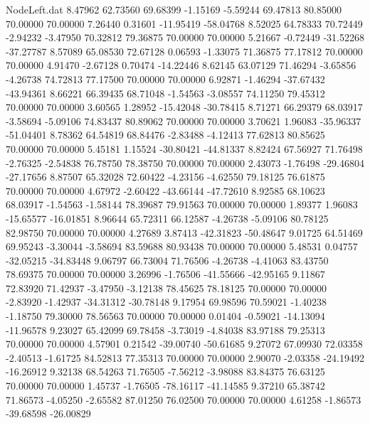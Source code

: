 \begin{filecontents}{NodeLeft.dat}
   8.47962   62.73560   69.68399    -1.15169   -5.59244   69.47813   80.85000   70.00000   70.00000    7.26440    0.31601  -11.95419  -58.04768
   8.52025   64.78333   70.72449    -2.94232   -3.47950   70.32812   79.36875   70.00000   70.00000    5.21667   -0.72449  -31.52268  -37.27787
   8.57089   65.08530   72.67128     0.06593   -1.33075   71.36875   77.17812   70.00000   70.00000    4.91470   -2.67128    0.70474  -14.22446
   8.62145   63.07129   71.46294    -3.65856   -4.26738   74.72813   77.17500   70.00000   70.00000    6.92871   -1.46294  -37.67432  -43.94361
   8.66221   66.39435   68.71048    -1.54563   -3.08557   74.11250   79.45312   70.00000   70.00000    3.60565    1.28952  -15.42048  -30.78415
   8.71271   66.29379   68.03917    -3.58694   -5.09106   74.83437   80.89062   70.00000   70.00000    3.70621    1.96083  -35.96337  -51.04401
   8.78362   64.54819   68.84476    -2.83488   -4.12413   77.62813   80.85625   70.00000   70.00000    5.45181    1.15524  -30.80421  -44.81337
   8.82424   67.56927   71.76498    -2.76325   -2.54838   76.78750   78.38750   70.00000   70.00000    2.43073   -1.76498  -29.46804  -27.17656
   8.87507   65.32028   72.60422    -4.23156   -4.62550   79.18125   76.61875   70.00000   70.00000    4.67972   -2.60422  -43.66144  -47.72610
   8.92585   68.10623   68.03917    -1.54563   -1.58144   78.39687   79.91563   70.00000   70.00000    1.89377    1.96083  -15.65577  -16.01851
   8.96644   65.72311   66.12587    -4.26738   -5.09106   80.78125   82.98750   70.00000   70.00000    4.27689    3.87413  -42.31823  -50.48647
   9.01725   64.51469   69.95243    -3.30044   -3.58694   83.59688   80.93438   70.00000   70.00000    5.48531    0.04757  -32.05215  -34.83448
   9.06797   66.73004   71.76506    -4.26738   -4.41063   83.43750   78.69375   70.00000   70.00000    3.26996   -1.76506  -41.55666  -42.95165
   9.11867   72.83920   71.42937    -3.47950   -3.12138   78.45625   78.18125   70.00000   70.00000   -2.83920   -1.42937  -34.31312  -30.78148
   9.17954   69.98596   70.59021    -1.40238   -1.18750   79.30000   78.56563   70.00000   70.00000    0.01404   -0.59021  -14.13094  -11.96578
   9.23027   65.42099   69.78458    -3.73019   -4.84038   83.97188   79.25313   70.00000   70.00000    4.57901    0.21542  -39.00740  -50.61685
   9.27072   67.09930   72.03358    -2.40513   -1.61725   84.52813   77.35313   70.00000   70.00000    2.90070   -2.03358  -24.19492  -16.26912
   9.32138   68.54263   71.76505    -7.56212   -3.98088   83.84375   76.63125   70.00000   70.00000    1.45737   -1.76505  -78.16117  -41.14585
   9.37210   65.38742   71.86573    -4.05250   -2.65582   87.01250   76.02500   70.00000   70.00000    4.61258   -1.86573  -39.68598  -26.00829

\end{filecontents}
